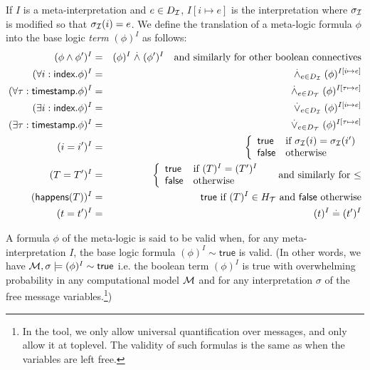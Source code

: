 \begin{definition}
  If $I$ is a meta-interpretation and $e\in D_{\mathcal{I}}$,
  $I[i\mapsto e]$ is the interpretation where $\sigma_{\mathcal{I}}$ is
  modified so that $\sigma_{\mathcal{I}}(i)=e$.
  We define the translation of a meta-logic formula $\phi$
  into the base logic \emph{term} $(\phi)^I$
  as follows:
  \begin{eqnarray*}
    (\phi\wedge\phi')^I &=& (\phi)^I \stackrel{.}{\wedge} (\phi')^I
    \quad \text{and similarly for other boolean connectives} \\
    (\forall i:\textsf{index}. \phi)^I &=&
    \stackrel{.}{\wedge}_{e\in D_{\mathcal{I}}} (\phi)^{I[i\mapsto e]} \\
    (\forall \tau:\textsf{timestamp}. \phi)^I &=&
    \stackrel{.}{\wedge}_{e\in D_{\mathcal{T}}} (\phi)^{I[\tau\mapsto e]} \\
    (\exists i:\textsf{index}. \phi)^I &=&
    \stackrel{.}{\vee}_{e\in D_{\mathcal{I}}} (\phi)^{I[i\mapsto e]} \\
    (\exists \tau:\textsf{timestamp}. \phi)^I &=&
    \stackrel{.}{\vee}_{e\in D_{\mathcal{T}}} (\phi)^{I[\tau\mapsto e]} \\
    (i=i')^I &=&
    \left\{\begin{array}{ll}
      \mathsf{true} & \text{if } \sigma_{\mathcal{I}}(i)=\sigma_{\mathcal{I}}(i') \\
      \mathsf{false} & \text{otherwise}
    \end{array}\right. \\
    (T = T')^I &=&
    \left\{\begin{array}{ll}
      \mathsf{true} & \text{if } (T)^I = (T')^I \\
      \mathsf{false} & \text{otherwise}
    \end{array}\right.
    \quad\text{ and similarly for $\leq$} \\
    (\textsf{happens}(T))^I &=& \mathsf{true}
    \text{ if } (T)^I \in H_{\mathcal{T}}
    \text{ and } \mathsf{false} \text{ otherwise}
    \\
    (t=t')^I &=& (t)^I \stackrel{.}{=} (t')^I
  \end{eqnarray*}
\end{definition}

\begin{definition}
  A formula $\phi$ of the meta-logic is said to be valid when,
  for any meta-interpretation $I$, the base logic formula
  $(\phi)^I \sim \mathsf{true}$ is valid.
  (In other words, we have $\mathcal{M},\sigma\models(\phi)^I\sim\mathsf{true}$
  i.e. the boolean term $(\phi)^I$ is true with overwhelming
  probability in any computational model $\mathcal{M}$ and for any interpretation
  $\sigma$ of the free message variables.\footnote{
    In the tool, we only allow universal quantification over messages, and
  only allow it at toplevel. The validity of such formulas is the same as
  when the variables are left free.})
\end{definition}

